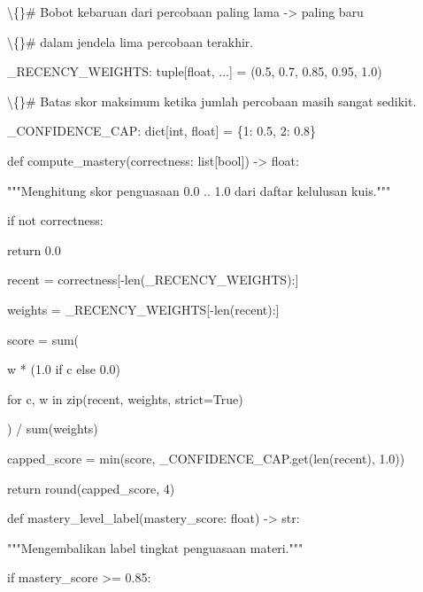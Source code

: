 \documentclass[12pt,a4paper]{article}
\begin{document}
\textbackslash\{\}\# Bobot kebaruan dari percobaan paling lama -\textgreater{} paling baru



\textbackslash\{\}\# dalam jendela lima percobaan terakhir.



\_RECENCY\_WEIGHTS: tuple{[}float, ...{]} = (0.5, 0.7, 0.85, 0.95, 1.0)



\textbackslash\{\}\# Batas skor maksimum ketika jumlah percobaan masih sangat sedikit.



\_CONFIDENCE\_CAP: dict{[}int, float{]} = \{1: 0.5, 2: 0.8\}



def compute\_mastery(correctness: list{[}bool{]}) -\textgreater{} float:



"""Menghitung skor penguasaan 0.0 .. 1.0 dari daftar kelulusan kuis."""



if not correctness:



return 0.0



recent = correctness{[}-len(\_RECENCY\_WEIGHTS):{]}



weights = \_RECENCY\_WEIGHTS{[}-len(recent):{]}



score = sum(



w * (1.0 if c else 0.0)



for c, w in zip(recent, weights, strict=True)



) / sum(weights)



capped\_score = min(score, \_CONFIDENCE\_CAP.get(len(recent), 1.0))



return round(capped\_score, 4)



def mastery\_level\_label(mastery\_score: float) -\textgreater{} str:



"""Mengembalikan label tingkat penguasaan materi."""



if mastery\_score \textgreater{}= 0.85:
\end{document}
